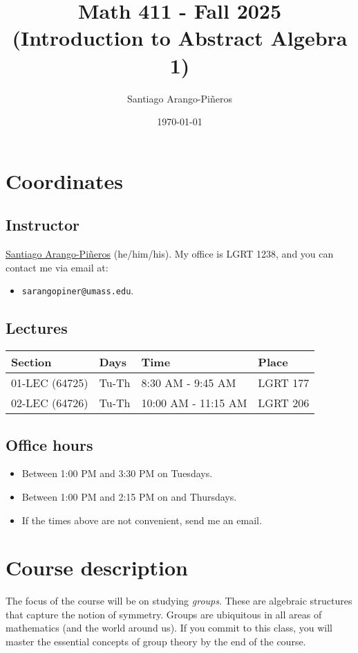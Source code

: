 \documentclass[11pt]{article}
\author{Santiago Arango-Piñeros}
\date{\today}
\title{Math 411 - Fall 2025\\\medskip
\large (Introduction to Abstract Algebra 1)}
\begin{document}
\maketitle
\tableofcontents



\section{Coordinates}
\label{sec:org66c243d}
\subsection{Instructor}
\label{sec:org18afe59}
\href{https://sarangop1728.github.io/}{Santiago Arango-Piñeros} (he/him/his).
My office is LGRT 1238, and you can contact me via email at:
\begin{itemize}
\item \texttt{sarangopiner@umass.edu}.
\end{itemize}

\subsection{Lectures}
\label{sec:org50c5e5a}
\begin{center}
\begin{tabular}{llll}
\hline
Section & Days & Time & Place\\[0pt]
\hline
01-LEC (64725) & Tu-Th & 8:30 AM - 9:45 AM & LGRT 177\\[0pt]
02-LEC (64726) & Tu-Th & 10:00 AM - 11:15 AM & LGRT 206\\[0pt]
\hline
\end{tabular}
\end{center}

\subsection{Office hours}
\label{sec:org9b5c8c9}
\begin{itemize}
\item Between 1:00 PM and 3:30 PM on Tuesdays.
\item Between 1:00 PM and 2:15 PM on and Thursdays.
\item If the times above are not convenient, send me an email.
\end{itemize}

\section{Course description}
\label{sec:org169af84}
The focus of the course will be on studying \emph{groups}. These are algebraic
structures that capture the notion of symmetry. Groups are ubiquitous in all
areas of mathematics (and the world around us). If you commit to this class,
you will master the essential concepts of group theory by the end of the
course.
\end{document}
